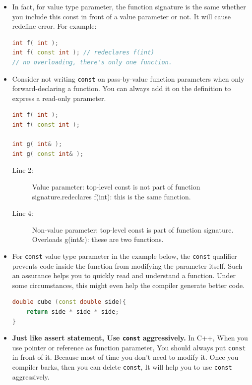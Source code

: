 \documentclass[a4paper,11pt,twoside]{book}
\begin{document}
\begin{itemize}
	\item In fact, for value type parameter, the function signature is the same whether you include this const in front of a value parameter or not. It will cause redefine error. For example:
\begin{lstlisting}[frame=single, language=c++]
int f( int );
int f( const int ); // redeclares f(int)
// no overloading, there's only one function.
\end{lstlisting}
	
	\item  Consider not writing \texttt{const} on pass-by-value function parameters when only forward-declaring a function. You can always add it on the definition to express a read-only parameter.
\begin{lstlisting}[frame=single, language=c++]
int f( int );
int f( const int );    

int g( int& );
int g( const int& );   
\end{lstlisting}
	\begin{description}
		\item[Line 2:] Value parameter: top-level const is not part of function signature.redeclares f(int): this is the same function.
		
		\item[Line 4:] Non-value parameter: top-level const is part of function signature. Overloads g(int\&): these are two functions.
	\end{description}
	
	\item For \texttt{const} value type parameter in the example below, the \texttt{const} qualifier prevents code inside the function from modifying the parameter itself. Such an assurance helps you to quickly read and understand a function. Under some circumstances, this might even help the compiler generate better code. 
\begin{lstlisting}[frame=single, language=c++]
double cube (const double side){
	return side * side * side;
}
\end{lstlisting}
	
	\item \textbf{Just like assert statement, Use \texttt{const} aggressively.}  In C++, When you use pointer or reference as function parameter, You should always put \texttt{const} in front of it. Because most of time you don't need to modify it.  Once you compiler barks, then you can delete \texttt{const}, It will help you to use \texttt{const} aggressively.
	

\end{itemize}
\end{document}
